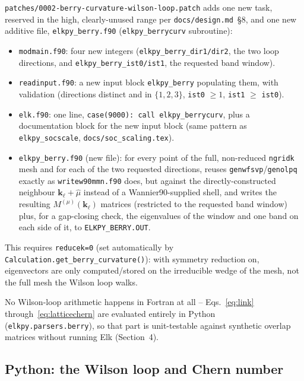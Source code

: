 \documentclass[11pt]{article}
\begin{document}
\texttt{patches/0002-berry-curvature-wilson-loop.patch} adds one new task, reserved in
the high, clearly-unused range per \texttt{docs/design.md}~\S8, and one new additive
file, \texttt{elkpy\_berry.f90} (\texttt{elkpy\_berrycurv} subroutine):
\begin{itemize}
  \item \texttt{modmain.f90}: four new integers (\texttt{elkpy\_berry\_dir1/dir2},
    the two loop directions, and \texttt{elkpy\_berry\_ist0/ist1}, the requested band
    window).
  \item \texttt{readinput.f90}: a new input block \texttt{elkpy\_berry} populating
    them, with validation (directions distinct and in $\{1,2,3\}$, \texttt{ist0}
    $\ge 1$, \texttt{ist1} $\ge$ \texttt{ist0}).
  \item \texttt{elk.f90}: one line, \texttt{case(9000): call elkpy\_berrycurv}, plus a
    documentation block for the new input block (same pattern as
    \texttt{elkpy\_socscale}, \texttt{docs/soc\_scaling.tex}).
  \item \texttt{elkpy\_berry.f90} (new file): for every point of the full,
    non-reduced \texttt{ngridk} mesh and for each of the two requested directions,
    reuses \texttt{genwfsvp}/\texttt{genolpq} exactly as \texttt{writew90mmn.f90} does,
    but against the directly-constructed neighbour $\mathbf k_\ell+\hat\mu$ instead of
    a Wannier90-supplied shell, and writes the resulting $M^{(\mu)}(\mathbf k_\ell)$
    matrices (restricted to the requested band window) plus, for a gap-closing check,
    the eigenvalues of the window and one band on each side of it, to
    \texttt{ELKPY\_BERRY.OUT}.
\end{itemize}
This requires \texttt{reducek=0} (set automatically by
\texttt{Calculation.get\_berry\_curvature()}): with symmetry reduction on, eigenvectors
are only computed/stored on the irreducible wedge of the mesh, not the full mesh the
Wilson loop walks.

No Wilson-loop arithmetic happens in Fortran at all -- Eqs.~\eqref{eq:link}
through~\eqref{eq:latticechern} are evaluated entirely in Python
(\texttt{elkpy.parsers.berry}), so that part is unit-testable against synthetic overlap
matrices without running Elk (Section~4).

\subsection{Python: the Wilson loop and Chern number}
\end{document}
